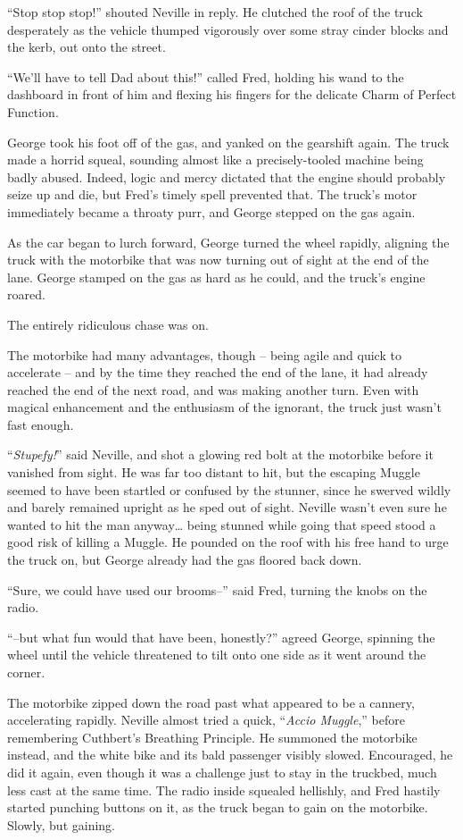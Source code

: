 ``Stop stop stop!'' shouted Neville in reply. He clutched the roof of
the truck desperately as the vehicle thumped vigorously over some stray
cinder blocks and the kerb, out onto the street.

``We'll have to tell Dad about this!'' called Fred, holding his wand to
the dashboard in front of him and flexing his fingers for the delicate
Charm of Perfect Function.

George took his foot off of the gas, and yanked on the gearshift again.
The truck made a horrid squeal, sounding almost like a precisely-tooled
machine being badly abused. Indeed, logic and mercy dictated that the
engine should probably seize up and die, but Fred's timely spell
prevented that. The truck's motor immediately became a throaty purr, and
George stepped on the gas again.

As the car began to lurch forward, George turned the wheel rapidly,
aligning the truck with the motorbike that was now turning out of sight
at the end of the lane. George stamped on the gas as hard as he could,
and the truck's engine roared.

The entirely ridiculous chase was on.

The motorbike had many advantages, though -- being agile and quick to
accelerate -- and by the time they reached the end of the lane, it had
already reached the end of the next road, and was making another turn.
Even with magical enhancement and the enthusiasm of the ignorant, the
truck just wasn't fast enough.

``\emph{Stupefy!}'' said Neville, and shot a glowing red bolt at the
motorbike before it vanished from sight. He was far too distant to hit,
but the escaping Muggle seemed to have been startled or confused by the
stunner, since he swerved wildly and barely remained upright as he sped
out of sight. Neville wasn't even sure he wanted to hit the man
anyway\ldots{} being stunned while going that speed stood a good risk of
killing a Muggle. He pounded on the roof with his free hand to urge the
truck on, but George already had the gas floored back down.

``Sure, we could have used our brooms--'' said Fred, turning the knobs
on the radio.

``--but what fun would that have been, honestly?'' agreed George,
spinning the wheel until the vehicle threatened to tilt onto one side as
it went around the corner.

The motorbike zipped down the road past what appeared to be a cannery,
accelerating rapidly. Neville almost tried a quick, ``\emph{Accio
Muggle},'' before remembering Cuthbert's Breathing Principle. He
summoned the motorbike instead, and the white bike and its bald
passenger visibly slowed. Encouraged, he did it again, even though it
was a challenge just to stay in the truckbed, much less cast at the same
time. The radio inside squealed hellishly, and Fred hastily started
punching buttons on it, as the truck began to gain on the motorbike.
Slowly, but gaining.

